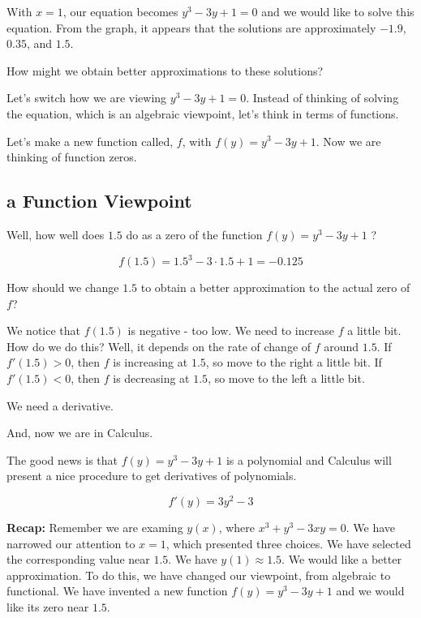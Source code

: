 \documentclass{ximera}
\begin{document}
With $x=1$, our equation becomes $y^3 - 3 y + 1 = 0$ and we would like to solve this equation. From the graph, it appears that the solutions are approximately $-1.9$, $0.35$, and $1.5$.

How might we obtain better approximations to these solutions?





Let's switch how we are viewing $y^3 - 3 y + 1 = 0$.  Instead of thinking of solving the equation, which is an algebraic viewpoint, let's think in terms of functions.

Let's make a new function called, $f$, with $f(y) = y^3 - 3 y + 1$.  Now we are thinking of function zeros. 








\subsection*{a Function Viewpoint}


Well, how well does $1.5$ do as a zero of the function $f(y) = y^3 - 3 y + 1$ ?


\[  f(1.5) = 1.5^3 - 3 \cdot 1.5 + 1 = -0.125 \]


How should we change $1.5$ to obtain a better approximation to the actual zero of $f$? 


We notice that $f(1.5)$ is negative - too low.  We need to increase $f$ a little bit.  How do we do this?  Well, it depends on the rate of change of $f$ around $1.5$.  If $f'(1.5) > 0$, then $f$ is increasing at $1.5$, so move to the right a little bit. If $f'(1.5) < 0$, then $f$ is decreasing at $1.5$, so move to the left a little bit. 



We need a derivative.

And, now we are in Calculus.





The good news is that $f(y) = y^3 - 3 y + 1$ is a polynomial and Calculus will present a nice procedure to get derivatives of polynomials.


\[
f'(y) = 3 y^2 - 3
\]




\textbf{Recap: } Remember we are examing $y(x)$, where $x^3 + y^3 - 3xy = 0$.  We have narrowed our attention to $x=1$, which presented three choices. We have selected the corresponding value near $1.5$.  We have $y(1) \approx 1.5$. We would like a better approximation.  To do this, we have changed our viewpoint, from algebraic to functional.  We have invented a new function $f(y) = y^3 - 3 y + 1$ and we would like its zero near $1.5$.
\end{document}
